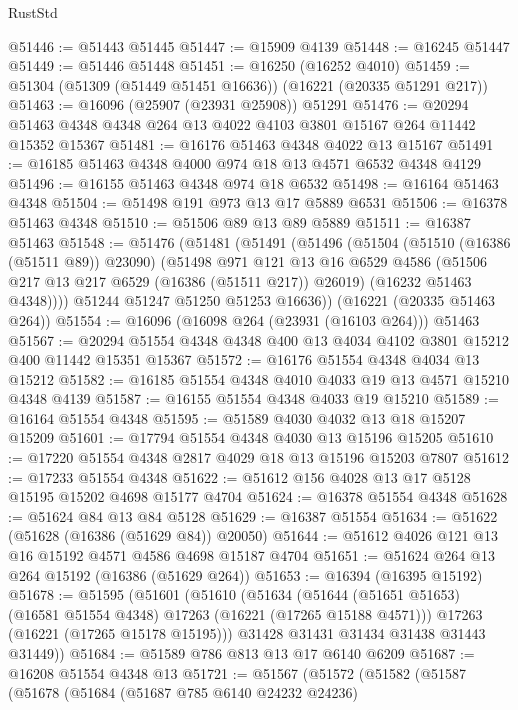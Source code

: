 \begin{lexlean}{RustStd}
\begin{coremodule}
@51446 := @51443 @51445
@51447 := @15909 @4139
@51448 := @16245 @51447
@51449 := @51446 @51448
@51451 := @16250 (@16252 @4010)
@51459 := @51304 (@51309 (@51449 @51451 @16636)) (@16221 (@20335 @51291 @217))
@51463 := @16096 (@25907 (@23931 @25908)) @51291
@51476 := @20294 @51463 @4348 @4348 @264 @13 @4022 @4103 @3801 @15167 @264 @11442 @15352 @15367
@51481 := @16176 @51463 @4348 @4022 @13 @15167
@51491 := @16185 @51463 @4348 @4000 @974 @18 @13 @4571 @6532 @4348 @4129
@51496 := @16155 @51463 @4348 @974 @18 @6532
@51498 := @16164 @51463 @4348
@51504 := @51498 @191 @973 @13 @17 @5889 @6531
@51506 := @16378 @51463 @4348
@51510 := @51506 @89 @13 @89 @5889
@51511 := @16387 @51463
@51548 := @51476
    (@51481
      (@51491
        (@51496
          (@51504
            (@51510 (@16386 (@51511 @89)) @23090)
            (@51498
              @971
              @121
              @13
              @16
              @6529
              @4586
              (@51506 @217 @13 @217 @6529 (@16386 (@51511 @217)) @26019)
              (@16232 @51463 @4348))))
        @51244
        @51247
        @51250
        @51253
        @16636))
    (@16221 (@20335 @51463 @264))
@51554 := @16096 (@16098 @264 (@23931 (@16103 @264))) @51463
@51567 := @20294 @51554 @4348 @4348 @400 @13 @4034 @4102 @3801 @15212 @400 @11442 @15351 @15367
@51572 := @16176 @51554 @4348 @4034 @13 @15212
@51582 := @16185 @51554 @4348 @4010 @4033 @19 @13 @4571 @15210 @4348 @4139
@51587 := @16155 @51554 @4348 @4033 @19 @15210
@51589 := @16164 @51554 @4348
@51595 := @51589 @4030 @4032 @13 @18 @15207 @15209
@51601 := @17794 @51554 @4348 @4030 @13 @15196 @15205
@51610 := @17220 @51554 @4348 @2817 @4029 @18 @13 @15196 @15203 @7807
@51612 := @17233 @51554 @4348
@51622 := @51612 @156 @4028 @13 @17 @5128 @15195 @15202 @4698 @15177 @4704
@51624 := @16378 @51554 @4348
@51628 := @51624 @84 @13 @84 @5128
@51629 := @16387 @51554
@51634 := @51622 (@51628 (@16386 (@51629 @84)) @20050)
@51644 := @51612 @4026 @121 @13 @16 @15192 @4571 @4586 @4698 @15187 @4704
@51651 := @51624 @264 @13 @264 @15192 (@16386 (@51629 @264))
@51653 := @16394 (@16395 @15192)
@51678 := @51595
    (@51601
      (@51610
        (@51634
          (@51644 (@51651 @51653) (@16581 @51554 @4348) @17263 (@16221 (@17265 @15188 @4571)))
          @17263
          (@16221 (@17265 @15178 @15195)))
        @31428
        @31431
        @31434
        @31438
        @31443
        @31449))
@51684 := @51589 @786 @813 @13 @17 @6140 @6209
@51687 := @16208 @51554 @4348 @13
@51721 := @51567
    (@51572
      (@51582
        (@51587
          (@51678
            (@51684
              (@51687 @785 @6140 @24232 @24236)

\end{coremodule}
\end{lexlean}

